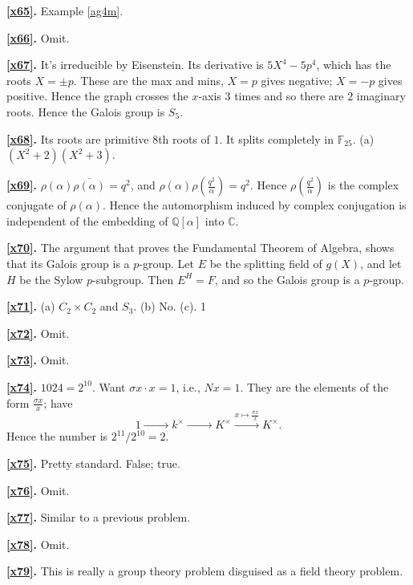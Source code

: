 \documentclass[a4paper,11pt,final,openany]{memoir}
\theoremstyle{nonumberplain}
\begin{document}
\medskip\noindent\textbf{\ref{x65}.} Example \ref{ag4m}.

\medskip\noindent\textbf{\ref{x66}.} Omit.

\medskip\noindent\textbf{\ref{x67}.} It's irreducible by Eisenstein. Its
derivative is $5X^{4}-5p^{4}$, which has the roots $X=\pm p$. These are the
max and mins, $X=p$ gives negative; $X=-p$ gives positive. Hence the graph
crosses the $x$-axis $3$ times and so there are $2$ imaginary roots. Hence the
Galois group is $S_{5}$.

\medskip\noindent\textbf{\ref{x68}.} Its roots are primitive $8$th roots of
$1$. It splits completely in $\mathbb{F}_{25}$. (a) $(X^{2}+2)(X^{2}+3)$.

\medskip\noindent\textbf{\ref{x69}.} $\rho(\alpha)\overline{\rho(\alpha
)}=q^{2}$, and $\rho(\alpha)\rho(\frac{q^{2}}{\alpha})=q^{2}$. Hence
$\rho(\frac{q^{2}}{\alpha})$ is the complex conjugate of $\rho(\alpha)$. Hence
the automorphism induced by complex conjugation is independent of the
embedding of ${\mathbb{Q}}[\alpha]$ into $\mathbb{C}$.

\medskip\noindent\textbf{\ref{x70}.} The argument that proves the Fundamental
Theorem of Algebra, shows that its Galois group is a $p$-group. Let $E$ be the
splitting field of $g(X)$, and let $H$ be the Sylow $p$-subgroup. Then
$E^{H}=F$, and so the Galois group is a $p$-group.

\medskip\noindent\textbf{\ref{x71}.} (a) $C_{2}\times C_{2}$ and $S_{3}$. (b)
No. (c). 1

\medskip\noindent\textbf{\ref{x72}.} Omit.

\medskip\noindent\textbf{\ref{x73}.} Omit.

\medskip\noindent\textbf{\ref{x74}.} $1024=2^{10}$. Want $\sigma x\cdot x=1$,
i.e., $Nx=1$. They are the elements of the form $\frac{\sigma x}{x}$; have
\[
1\xrightarrow{\phantom{x\mapsto\frac {\sigma x}x}}k^{\times}%
\xrightarrow{\phantom{x\mapsto\frac {\sigma x}x}}K^{\times}%
\xrightarrow{x\mapsto\frac {\sigma x}x}K^{\times} .
\]
Hence the number is $2^{11}/2^{10}=2$.

\medskip\noindent\textbf{\ref{x75}.} Pretty standard. False; true.

\medskip\noindent\textbf{\ref{x76}.} Omit.

\medskip\noindent\textbf{\ref{x77}.} Similar to a previous problem.

\medskip\noindent\textbf{\ref{x78}.} Omit.

\medskip\noindent\textbf{\ref{x79}.} This is really a group theory problem
disguised as a field theory problem.
\end{document}
